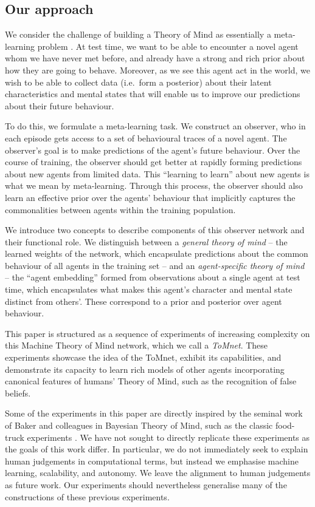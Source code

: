 \documentclass{article}
\begin{document}
\subsection{Our approach}

We consider the challenge of building a Theory of Mind as essentially a meta-learning problem \cite{schmidhuber1996simple, thrun1998learning, hochreiter2001learning, vilalta2002perspective}. At test time, we want to be able to encounter a novel agent whom we have never met before, and already have a strong and rich prior about how they are going to behave. Moreover, as we see this agent act in the world, we wish to be able to collect data (i.e.\ form a posterior) about their latent characteristics and mental states that will enable us to improve our predictions about their future behaviour.

To do this, we formulate a meta-learning task. We construct an observer, who in each episode gets access to a set of behavioural traces of a novel agent. The observer's goal is to make predictions of the agent's future behaviour. Over the course of training, the observer should get better at rapidly forming predictions about new agents from limited data. This ``learning to learn'' about new agents is what we mean by meta-learning. Through this process, the observer should also learn an effective prior over the agents' behaviour that implicitly captures the commonalities between agents within the training population.

We introduce two concepts to describe components of this observer network and their functional role. We distinguish between a {\it general theory of mind} -- the learned weights of the network, which encapsulate predictions about the common behaviour of all agents in the training set -- and an {\it agent-specific theory of mind} -- the ``agent embedding'' formed from observations about a single agent at test time, which encapsulates what makes this agent's character and mental state distinct from others'. These correspond to a prior and posterior over agent behaviour.

This paper is structured as a sequence of experiments of increasing complexity on this Machine Theory of Mind network, which we call a {\it ToMnet}. These experiments showcase the idea of the ToMnet, exhibit its capabilities, and demonstrate its capacity to learn rich models of other agents incorporating canonical features of humans' Theory of Mind, such as the recognition of false beliefs.

Some of the experiments in this paper are directly inspired by the seminal work of Baker and colleagues in Bayesian Theory of Mind, such as the classic food-truck experiments \cite{baker2011bayesian, Baker2017}. We have not sought to directly replicate these experiments as the goals of this work differ. In particular, we do not immediately seek to explain human judgements in computational terms, but instead we emphasise machine learning, scalability, and autonomy. We leave the alignment to human judgements as future work. Our experiments should nevertheless generalise many of the constructions of these previous experiments.
\end{document}
